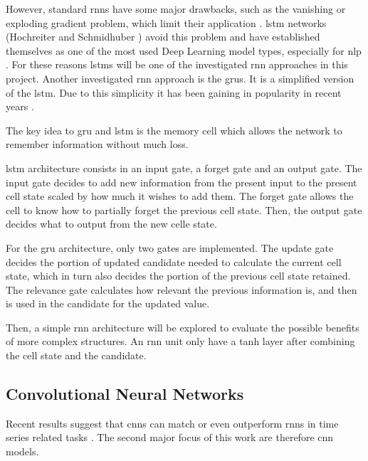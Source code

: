 \documentclass[conference]{IEEEtran}
\begin{document}
However, standard \glspl{rnn} have some major drawbacks, such as the vanishing or exploding gradient problem, which limit their application \cite{Bengio1994}. \gls{lstm} networks (Hochreiter and Schmidhuber \cite{Hochreiter1997}) avoid this problem and have established themselves as one of the most used Deep Learning model types, especially for \gls{nlp} \cite{Wu2016}. For these reasons \glspl{lstm} will be one of the investigated \gls{rnn} approaches in this project. Another investigated \gls{rnn} approach is the \glspl{gru}. It is a simplified version of the \gls{lstm}. Due to this simplicity it has been gaining in popularity in recent years \cite{Rana2016}. 

The key idea to \gls{gru} and \gls{lstm} is the memory cell which allows the network to remember information without much loss.

\gls{lstm} architecture consists in an input gate, a forget gate and an output gate. The input gate decides to add new information from the present input to the present cell state scaled by how much it wishes to add them. The forget gate allows the cell to know how to partially forget the previous cell state. Then, the output gate decides what to output from the new celle state.

For the \gls{gru} architecture, only two gates are implemented. The update gate decides the portion of updated candidate needed to calculate the current cell state, which in turn also decides the portion of the previous cell state retained. The relevance gate calculates how relevant the previous information is, and then is used in the candidate for the updated value.

Then, a simple \gls{rnn} architecture will be explored to evaluate the possible benefits of more complex structures. An \gls{rnn} unit only have a tanh layer after combining the cell state and the candidate.







\noindent
\subsection{Convolutional Neural Networks}

Recent results suggest that \glspl{cnn} can match or even outperform \glspl{rnn} in time series related tasks \cite{Bai2018}. The second major focus of this work are therefore \gls{cnn} models.
\end{document}
